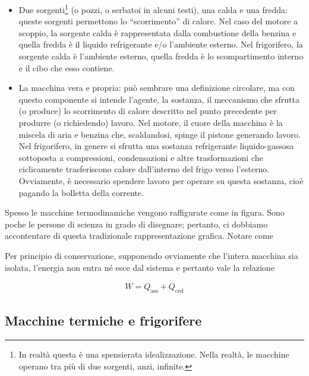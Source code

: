 \begin{itemize}
    \item Due sorgenti\footnote{In realtà questa è una
    spensierata idealizzazione. Nella realtà, le macchine
    operano tra più di due sorgenti, anzi, infinite.} (o pozzi, o serbatoi in alcuni
    testi), una calda e una fredda: queste sorgenti
    permettono lo ``scorrimento'' di calore. Nel caso
    del motore a scoppio, la sorgente calda è rappresentata dalla
    combustione della benzina e quella fredda è il
    liquido refrigerante e/o l'ambiente esterno. Nel
    frigorifero, la sorgente calda è l'ambiente esterno,
    quella fredda è lo scompartimento interno e il
    cibo che esso contiene.

    \item La macchina vera e propria: può sembrare
    una definizione circolare, ma con questo componente
    si intende l'agente, la sostanza, il meccanismo
    che sfrutta (o produce) lo scorrimento di
    calore descritto nel punto precedente per
    produrre (o richiedendo) lavoro. Nel motore,
    il cuore della macchina è la miscela di aria
    e benzina che, scaldandosi, spinge il pistone
    generando lavoro. Nel frigorifero, in genere si
    sfrutta una sostanza refrigerante liquido-gassosa
    sottoposta a compressioni, condensazioni e altre
    trasformazioni che ciclicamente trasferiscono
    calore dall'interno del frigo verso l'esterno.
    Ovviamente, è necessario spendere lavoro per
    operare su questa sostanza, cioè pagando la
    bolletta della corrente.
\end{itemize}

Spesso le macchine termodinamiche vengono raffigurate
come in figura.
Sono poche le persone di scienza in grado di disegnare;
pertanto, ci dobbiamo accontentare di questa tradizionale
rappresentazione grafica. Notare come

Per principio di conservazione, supponendo
ovviamente che l'intera macchina sia isolata, l'energia
non entra né esce dal sistema e pertanto vale la relazione

\begin{align}
    W = Q_\text{ass} + Q_\text{ced}\label{conservaz_macchina}
\end{align}

\subsection{Macchine termiche e frigorifere}


